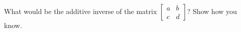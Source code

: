 \documentclass[space,handout,nooutcomes]{ximera}
\begin{document}
\begin{question}
What would be the additive inverse of the matrix 
$\begin{bmatrix} a&b \\ c&d \end{bmatrix}$?  
Show how you know.  
%
%
%
\end{question}
\end{document}
